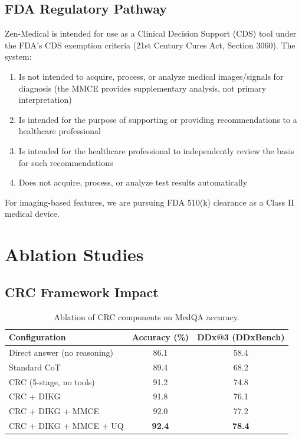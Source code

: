 \documentclass[11pt,a4paper]{article}
\begin{document}
\subsection{FDA Regulatory Pathway}

Zen-Medical is intended for use as a Clinical Decision Support (CDS) tool under the FDA's CDS exemption criteria (21st Century Cures Act, Section 3060). The system:
\begin{enumerate}
    \item Is not intended to acquire, process, or analyze medical images/signals for diagnosis (the MMCE provides supplementary analysis, not primary interpretation)
    \item Is intended for the purpose of supporting or providing recommendations to a healthcare professional
    \item Is intended for the healthcare professional to independently review the basis for such recommendations
    \item Does not acquire, process, or analyze test results automatically
\end{enumerate}

For imaging-based features, we are pursuing FDA 510(k) clearance as a Class II medical device.

\section{Ablation Studies}
\label{sec:ablation}

\subsection{CRC Framework Impact}

\begin{table}[t]
\centering
\caption{Ablation of CRC components on MedQA accuracy.}
\label{tab:crc_ablation}
\begin{tabular}{lcc}
\toprule
\textbf{Configuration} & \textbf{Accuracy (\%)} & \textbf{DDx@3 (DDxBench)} \\
\midrule
Direct answer (no reasoning) & 86.1 & 58.4 \\
Standard CoT & 89.4 & 68.2 \\
CRC (5-stage, no tools) & 91.2 & 74.8 \\
CRC + DIKG & 91.8 & 76.1 \\
CRC + DIKG + MMCE & 92.0 & 77.2 \\
CRC + DIKG + MMCE + UQ & \textbf{92.4} & \textbf{78.4} \\
\bottomrule
\end{tabular}
\end{table}
\end{document}
